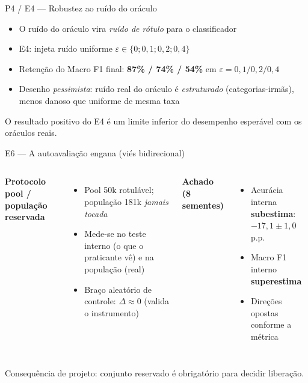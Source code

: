 \documentclass[aspectratio=169,11pt]{beamer}
\begin{document}
\begin{frame}{P4 / E4 --- Robustez ao ruído do oráculo}
\begin{itemize}
  \item O ruído do oráculo vira \emph{ruído de rótulo} para o classificador
  \item E4: injeta ruído uniforme $\varepsilon \in \{0; 0{,}1; 0{,}2; 0{,}4\}$
  \item Retenção do Macro F1 final: \textbf{87\% / 74\% / 54\%} em
        $\varepsilon = 0{,}1 / 0{,}2 / 0{,}4$
  \item Desenho \emph{pessimista}: ruído real do oráculo é \emph{estruturado}
        (categorias-irmãs), menos danoso que uniforme de mesma taxa
\end{itemize}
\vspace{0.3em}
\centering\footnotesize\color{ufprgreen}
O resultado positivo do E4 é um limite inferior do desempenho esperável com
os oráculos reais.
\end{frame}


\begin{frame}{E6 --- A autoavaliação engana (viés bidirecional)}
\begin{columns}[T]
\footnotesize
\textbf{Protocolo pool / população reservada}
\begin{itemize}
  \item Pool 50k rotulável; população 181k \emph{jamais tocada}
  \item Mede-se no teste interno (o que o praticante vê) e na população (real)
  \item Braço aleatório de controle: $\Delta \approx 0$ (valida o instrumento)
\end{itemize}
\footnotesize
\textbf{Achado (8 sementes)}
\begin{itemize}
  \item Acurácia interna \textbf{subestima}: $-17{,}1\pm1{,}0$ p.p.
  \item Macro F1 interno \textbf{superestima}
  \item Direções opostas conforme a métrica
\end{itemize}
\end{columns}
\vspace{0.4em}
\centering\color{ufprgreen}\footnotesize
Consequência de projeto: conjunto reservado é obrigatório para decidir liberação.
\end{frame}
\end{document}
